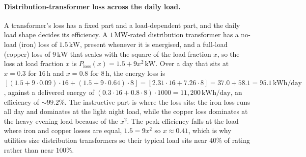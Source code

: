 \paragraph{Distribution-transformer loss across the daily load.} A
transformer's loss has a fixed part and a load-dependent part, and the daily
load shape decides its efficiency. A $1\,\si{\mega\watt}$-rated distribution
transformer has a no-load (iron) loss of $1.5\,\si{\kilo\watt}$, present
whenever it is energised, and a full-load (copper) loss of $9\,\si{\kilo
\watt}$ that scales with the square of the load fraction $x$, so the loss at
load fraction $x$ is $P_{\text{loss}}(x) = 1.5 + 9x^2\,\si{\kilo\watt}$.
Over a day that sits at $x = 0.3$ for $16\,\si{\hour}$ and $x = 0.8$ for
$8\,\si{\hour}$, the energy loss is $[(1.5 + 9\cdot 0.09)\cdot 16 + (1.5 +
9\cdot 0.64)\cdot 8] = [2.31\cdot 16 + 7.26\cdot 8] = 37.0 + 58.1 = 95.1\,
\si{\kilo\watt\hour}/\text{day}$, against a delivered energy of $(0.3\cdot
16 + 0.8\cdot 8)\cdot 1000 = 11{,}200\,\si{\kilo\watt\hour}/\text{day}$, an
efficiency of $\sim 99.2\%$. The instructive part is where the loss sits:
the iron loss runs all day and dominates at the light night load, while the
copper loss dominates at the heavy evening load because of the $x^2$. The
peak efficiency falls at the load where iron and copper losses are equal,
$1.5 = 9x^2$ so $x \approx 0.41$, which is why utilities size distribution
transformers so their typical load sits near $40\%$ of rating rather than
near $100\%$.

